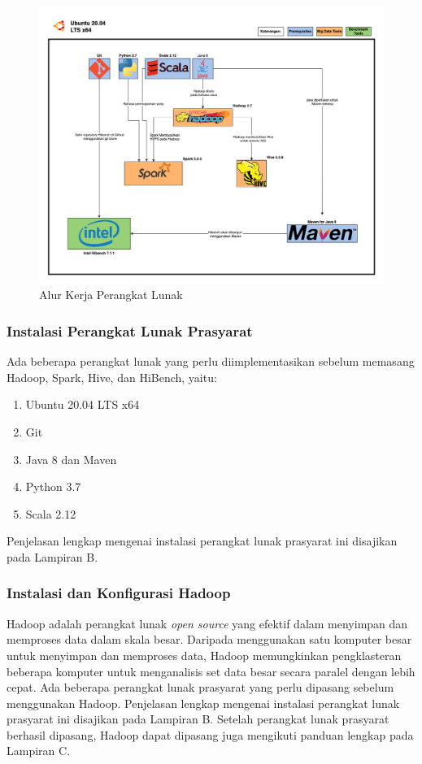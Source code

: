 \begin{figure}[ht]
    \centering
    \includegraphics[width=1\textwidth]{figures/ch03/alurkerja_soft.png}
    \caption{Alur Kerja Perangkat Lunak}
    \label{fig:alurkerja-soft}
\end{figure}

\subsubsection{Instalasi Perangkat Lunak Prasyarat}
Ada beberapa perangkat lunak yang perlu diimplementasikan sebelum memasang Hadoop, Spark, Hive, dan HiBench, yaitu:
\begin{enumerate}
	\item Ubuntu 20.04 LTS x64
	\item Git
	\item Java 8 dan Maven
	\item Python 3.7
	\item Scala 2.12
\end{enumerate}
Penjelasan lengkap mengenai instalasi perangkat lunak prasyarat ini disajikan pada Lampiran B.

\subsubsection{Instalasi dan Konfigurasi Hadoop}
Hadoop adalah perangkat lunak \textit{open source} yang efektif dalam menyimpan dan memproses data dalam skala besar. Daripada menggunakan satu komputer besar untuk menyimpan dan memproses data, Hadoop memungkinkan pengklasteran beberapa komputer untuk menganalisis set data besar secara paralel dengan lebih cepat. Ada beberapa perangkat lunak prasyarat yang perlu dipasang sebelum menggunakan Hadoop. Penjelasan lengkap mengenai instalasi perangkat lunak prasyarat ini disajikan pada Lampiran B. Setelah perangkat lunak prasyarat berhasil dipasang, Hadoop dapat dipasang juga mengikuti panduan lengkap pada Lampiran C.

